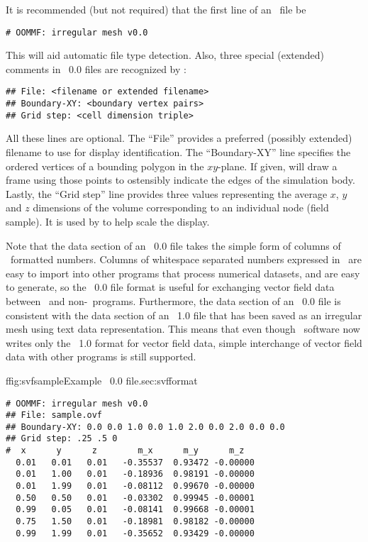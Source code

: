 It is recommended (but not required) that the first line of an \OVF\
file be
\begin{verbatim}
# OOMMF: irregular mesh v0.0
\end{verbatim}
This will aid automatic file type detection.  Also, three special
(extended) comments in \OVF\ 0.0 files are recognized by :
\begin{verbatim}
## File: <filename or extended filename>
## Boundary-XY: <boundary vertex pairs>
## Grid step: <cell dimension triple>
\end{verbatim}
All these lines are optional.  The ``File'' provides a preferred
(possibly extended) filename to use for display identification.  The
``Boundary-XY'' line specifies the ordered vertices of a bounding
polygon in the $xy$-plane.  If given, \app{mmDisp} will draw a frame
using those points to ostensibly indicate the edges of the simulation
body.  Lastly, the ``Grid step'' line provides three values
representing the average $x$, $y$ and $z$ dimensions of the volume
corresponding to an individual node (field sample).  It is used by
\app{mmDisp} to help scale the display.

Note that the data section of an \OVF\ 0.0 file takes the simple
form of columns of \ASCII\ formatted numbers.  Columns of whitespace
separated numbers expressed in \ASCII\ are easy to import
into other programs that process numerical datasets, and
are easy to generate, so the \OVF\ 0.0 file format is useful for
exchanging vector field data between \OOMMF\ and non-\OOMMF\ programs.
Furthermore, the data section of an \OVF\ 0.0 file is consistent
with the data section of an \OVF\ 1.0 file that has been saved
as an irregular mesh using text data representation.  This means that
even though \OOMMF\ software now writes only the \OVF\ 1.0 format
for vector field data, simple interchange of vector field data
with other programs is still supported.

\begin{codelisting}{f}{fig:svfsample}{Example \OVF\ 0.0 file.}{sec:svfformat}
\begin{verbatim}
# OOMMF: irregular mesh v0.0
## File: sample.ovf
## Boundary-XY: 0.0 0.0 1.0 0.0 1.0 2.0 0.0 2.0 0.0 0.0
## Grid step: .25 .5 0
#  x      y      z        m_x      m_y      m_z
  0.01   0.01   0.01   -0.35537  0.93472 -0.00000
  0.01   1.00   0.01   -0.18936  0.98191 -0.00000
  0.01   1.99   0.01   -0.08112  0.99670 -0.00000
  0.50   0.50   0.01   -0.03302  0.99945 -0.00001
  0.99   0.05   0.01   -0.08141  0.99668 -0.00001
  0.75   1.50   0.01   -0.18981  0.98182 -0.00000
  0.99   1.99   0.01   -0.35652  0.93429 -0.00000
\end{verbatim}
\end{codelisting}

